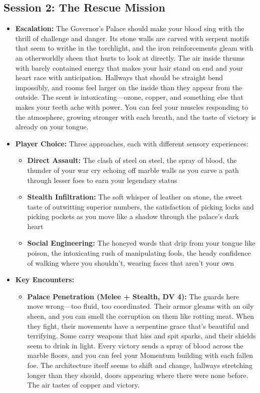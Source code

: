 \documentclass[11pt]{article}
\begin{document}
\subsection{Session 2: The Rescue Mission}
\begin{itemize}
\item \textbf{Escalation:} The Governor's Palace should make your blood sing with the thrill of challenge and danger. Its stone walls are carved with serpent motifs that seem to writhe in the torchlight, and the iron reinforcements gleam with an otherworldly sheen that hurts to look at directly. The air inside thrums with barely contained energy that makes your hair stand on end and your heart race with anticipation. Hallways that should be straight bend impossibly, and rooms feel larger on the inside than they appear from the outside. The scent is intoxicating—ozone, copper, and something else that makes your teeth ache with power. You can feel your muscles responding to the atmosphere, growing stronger with each breath, and the taste of victory is already on your tongue.
\item \textbf{Player Choice:} Three approaches, each with different sensory experiences:
  \begin{itemize}
  \item \textbf{Direct Assault:} The clash of steel on steel, the spray of blood, the thunder of your war cry echoing off marble walls as you carve a path through lesser foes to earn your legendary status
  \item \textbf{Stealth Infiltration:} The soft whisper of leather on stone, the sweet taste of outwitting superior numbers, the satisfaction of picking locks and picking pockets as you move like a shadow through the palace's dark heart
  \item \textbf{Social Engineering:} The honeyed words that drip from your tongue like poison, the intoxicating rush of manipulating fools, the heady confidence of walking where you shouldn't, wearing faces that aren't your own
  \end{itemize}
\item \textbf{Key Encounters:}
  \begin{itemize}
  \item \textbf{Palace Penetration (Melee + Stealth, DV 4):} The guards here move wrong—too fluid, too coordinated. Their armor gleams with an oily sheen, and you can smell the corruption on them like rotting meat. When they fight, their movements have a serpentine grace that's beautiful and terrifying. Some carry weapons that hiss and spit sparks, and their shields seem to drink in light. Every victory sends a spray of blood across the marble floors, and you can feel your Momentum building with each fallen foe. The architecture itself seems to shift and change, hallways stretching longer than they should, doors appearing where there were none before. The air tastes of copper and victory.

\end{itemize}
\end{itemize}
\end{document}

